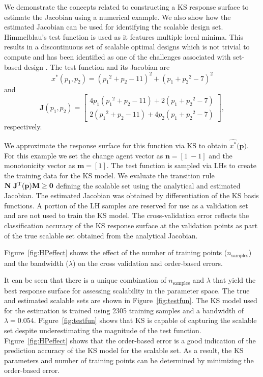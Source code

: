We demonstrate the concepts related to constructing a \ac{KS} response surface to estimate the Jacobian using a numerical example. We also show how the estimated Jacobian can be used for identifying the scalable design set. Himmelblau's test function is used as it features multiple local minima. {\color{red} This results in a discontinuous set of scalable optimal designs which is not trivial to compute and has been identified as one of the challenges associated with set-based design \cite{Shahan2012}}. The test function and its Jacobian are
\begin{displaymath}
		{x}^*(p_1,p_2) = ({p_1}^{2}+{p_2}-11)^{2}+({p_1}+{p_2}^{2}-7)^{2} 
		\end{displaymath}
		and
	\begin{displaymath}	
		\mathbf{J}(p_1,p_2) = \begin{bmatrix}
			4{p_1}({p_1}^2 + {p_2} - 11) + 2({p_1} + {p_2}^2 -7) \\ 
			2({p_1}^2 + {p_2} - 11) + 4{p_2}({p_1} + {p_2}^2 -7) 
	\end{bmatrix},
	\end{displaymath}
	respectively.%

We approximate the response surface for this function via \ac{KS} to obtain $\hat{{x}^*}(\mathbf{p)}$. For this example we set the change agent vector as $\mathbf{n} = \left[1~-1\right]$ and the monotonicity vector as $\mathbf{m} = \left[1\right]$. The test function is sampled via \acp{LH} to create the training data for the \ac{KS} model. We evaluate the transition rule $\mathbf{N}~\mathbf{J}^{\text T}(\mathbf{p})\mathbf{M} \ge \mathbf{0}$ defining the scalable set using the analytical and estimated Jacobian. The estimated Jacobian was obtained by differentiation of the \ac{KS} basis functions. A portion of the \ac{LH} samples are reserved for use as a validation set and are not used to train the \ac{KS} model. The cross-validation error reflects the classification accuracy of the \ac{KS} response surface at the validation points as part of the true scalable set obtained from the analytical Jacobian.

Figure~\ref{fig:HPeffect} shows the effect of the number of training points ($n_{\textrm{samples}}$) and the bandwidth ($\lambda$) on the cross validation and order-based errors.

It can be seen that there is a unique combination of $n_{\textrm{samples}}$ and $\lambda$ that yield the best response surface for assessing scalability in the parameter space. The true and estimated scalable sets are shown in Figure~\ref{fig:testfun}. The \ac{KS} model used for the estimation is trained using 2305 training samples and a bandwidth of $\lambda = 0.054$.
Figure~\ref{fig:testfun} shows that \ac{KS} is capable of capturing the scalable set despite underestimating the magnitude of the test function. Figure~\ref{fig:HPeffect} shows that the order-based error is a good indication of the prediction accuracy of the \ac{KS} model for the scalable set. As a result, the \ac{KS} parameters and number of training points can be determined by minimizing the order-based error.

